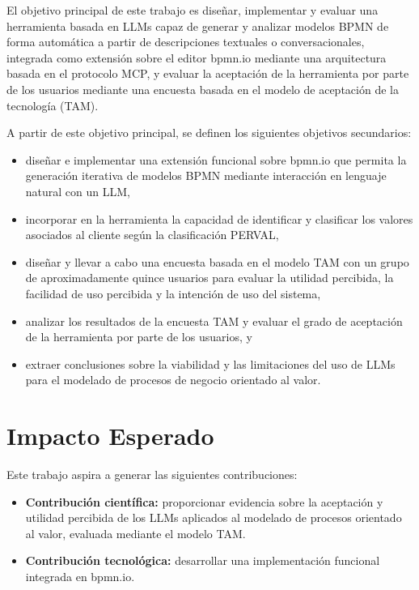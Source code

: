 El objetivo principal de este trabajo es diseñar, implementar y evaluar una herramienta basada en LLMs capaz de generar y analizar modelos BPMN de forma automática a partir de descripciones textuales o conversacionales,  integrada como extensión sobre el editor bpmn.io mediante una arquitectura basada en el protocolo MCP, y evaluar la aceptación de la herramienta por parte de los usuarios mediante una encuesta basada en el modelo de aceptación de la tecnología (TAM).


A partir de este objetivo principal, se definen los siguientes objetivos secundarios:

\begin{itemize}
    \item[$\bullet$] diseñar e implementar una extensión funcional sobre bpmn.io que permita la generación iterativa de modelos BPMN mediante interacción en lenguaje natural con un LLM,
    \item[$\bullet$] incorporar en la herramienta la capacidad de identificar y clasificar los valores asociados al cliente según la clasificación PERVAL,
    \item[$\bullet$] diseñar y llevar a cabo una encuesta basada en el modelo TAM con un grupo de aproximadamente quince usuarios para evaluar la utilidad percibida, la facilidad de uso percibida y la intención de uso del sistema,
    \item[$\bullet$] analizar los resultados de la encuesta TAM y evaluar el grado de aceptación de la herramienta por parte de los usuarios, y
    \item[$\bullet$] extraer conclusiones sobre la viabilidad y las limitaciones del uso de LLMs para el modelado de procesos de negocio orientado al valor.
\end{itemize}

\section{Impacto Esperado}

Este trabajo aspira a generar las siguientes contribuciones:

\begin{itemize}
    \item[$\bullet$] \textbf{Contribución científica:} proporcionar evidencia sobre la aceptación y utilidad percibida de los LLMs aplicados al modelado de procesos orientado al valor, evaluada mediante el modelo TAM.
    \item[$\bullet$] \textbf{Contribución tecnológica:} desarrollar una implementación funcional integrada en bpmn.io.
\end{itemize}

